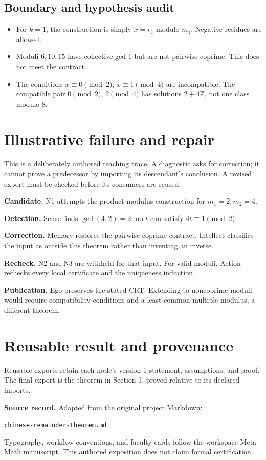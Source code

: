 \documentclass[preprint,12pt,aps,pra,showkeys,amsmath,amssymb,superscriptaddress,floatfix]{revtex4-2}
\theoremstyle{definition}
\theoremstyle{remark}
\newcommand{\field}[2]{\par\smallskip\noindent\textbf{#1.} #2\par}
\begin{document}
\subsection{Boundary and hypothesis audit}

\begin{itemize}
\item
  For \(k=1\), the construction is simply \(x=r_1\) modulo \(m_1\).
  Negative residues are allowed.
\item
  Moduli \(6,10,15\) have collective gcd \(1\) but are not pairwise
  coprime. This does not meet the contract.
\item
  The conditions \(x\equiv0\pmod2\), \(x\equiv1\pmod4\) are
  incompatible. The compatible pair \(0\pmod2\), \(2\pmod4\) has
  solutions \(2+4\mathbb Z\), not one class modulo \(8\).
\end{itemize}

\section{Illustrative failure and repair}

This is a deliberately authored teaching trace. A diagnostic asks for
correction; it cannot prove a predecessor by importing its descendant's
conclusion. A revised export must be checked before its consumers are
reused.

\field{Candidate}{N1 attempts the product-modulus construction for \(m_1=2,m_2=4\).}

\field{Detection}{Sense finds \(\gcd(4,2)=2\); no \(t\) can satisfy \(4t\equiv1\pmod2\).}

\field{Correction}{Memory restores the pairwise-coprime contract. Intellect classifies the
input as outside this theorem rather than inventing an inverse.}

\field{Recheck}{N2 and N3 are withheld for that input. For valid moduli, Action rechecks
every local certificate and the uniqueness induction.}

\field{Publication}{Ego preserves the stated CRT. Extending to noncoprime moduli would
require compatibility conditions and a least-common-multiple modulus, a
different theorem.}

\section{Reusable result and provenance}
Reusable exports retain each node's version 1 statement, assumptions, and proof.
The final export is the theorem in Section 1, proved relative to its declared imports.

\smallskip\noindent\textbf{Source record.} Adapted from the original project Markdown:
\par\noindent\nolinkurl{chinese-remainder-theorem.md}\par
Typography, workflow conventions, and faculty cards follow the workspace Meta-Math
manuscript. This authored exposition does not claim formal certification.
\end{document}
